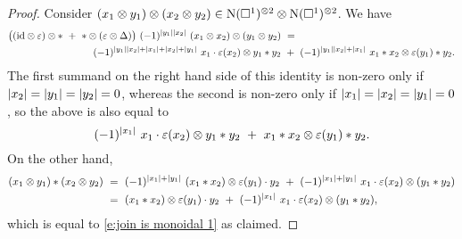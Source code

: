 \begin{proof}
	Consider $(x_1 \otimes y_1) \otimes (x_2 \otimes y_2) \in \operatorname{N}(\square^1)^{\otimes 2} \otimes \operatorname{N}(\square^1)^{\otimes 2}$.
	We have
	\[
	\begin{split}
	\big((\id \otimes \varepsilon) \otimes \ast \ + \ \ast \otimes (\varepsilon \otimes \Delta)\big) \ (-1)^{\bars{y_1} \bars{x_2}} \ (x_1 \otimes x_2) \otimes (y_1 \otimes y_2) \ & = \\
	(-1)^{\bars{y_1} \bars{x_2} + \bars{x_1} + \bars{x_2} + \bars{y_1}} \ x_1 \cdot \varepsilon(x_2) \otimes y_1 \ast y_2 \ & + \ 
	(-1)^{\bars{y_1} \bars{x_2} + \bars{x_1}} \ x_1 \ast x_2 \otimes \varepsilon(y_1) \ast y_2.
	\end{split}
	\]
	The first summand on the right hand side of this identity is non-zero only if $\vert{x_2}\vert = \vert{y_1}\vert = \vert{y_2}\vert = 0$, whereas the second is non-zero only if $\vert{x_1}\vert = \vert{x_2}\vert = \vert{y_1}\vert = 0$, so the above is also equal to
	\begin{equation} \label{e:join is monoidal 1}
	(-1)^{\bars{x_1}} \ x_1 \cdot \varepsilon(x_2) \otimes y_1 \ast y_2 \ + \ 
	x_1 \ast x_2 \otimes \varepsilon(y_1) \ast y_2.
	\end{equation}
	On the other hand,
	\begin{align*}
	(x_1 \otimes y_1) \ast (x_2 \otimes y_2) \ & =\ 
	(-1)^{\bars{x_1} + \bars{y_1}} \ (x_1 \ast x_2) \otimes \varepsilon(y_1) \cdot y_2 \ +\
	(-1)^{\bars{x_1} + \bars{y_1}} \ x_1 \cdot \varepsilon(x_2) \otimes (y_1 \ast y_2) \\ \ & =\ 
	(x_1 \ast x_2) \otimes \varepsilon(y_1) \cdot y_2 \ +\
	(-1)^{\bars{x_1}} \ x_1 \cdot \varepsilon(x_2) \otimes (y_1 \ast y_2),
	\end{align*}
	which is equal to \eqref{e:join is monoidal 1} as claimed.
\end{proof}

